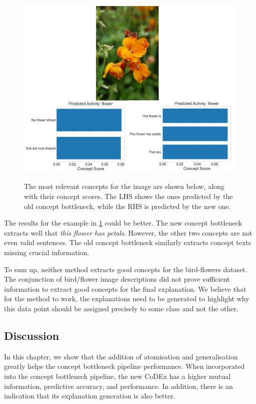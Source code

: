\begin{figure}[h]
\caption{The most relevant concepts for the image are shown below, along with their concept scores. The LHS shows the ones predicted by the old concept bottleneck, while the RHS is predicted by the new one.}
\centering
\includegraphics[width=\textwidth]{concept-bottleneck-pipeline/flower_predictions.png}
\label{flower-concept-predictions}
\end{figure}

The results for the example in \ref{flower-concept-predictions} could be better.
The new concept bottleneck extracts well that \emph{this flower has petals}.
However, the other two concepts are not even valid sentences.
The old concept bottleneck similarly extracts concept texts missing crucial information.


To sum up, neither method extracts good concepts for the bird-flowers dataset.
The conjunction of bird/flower image descriptions did not prove sufficient information to extract good concepts for the final explanation.
We believe that for the method to work, the explanations need to be generated to highlight why this data point should be assigned precisely to some class and not the other.


\subsection{Discussion}

In this chapter, we show that the addition of atomisation and generalisation greatly helps the concept bottleneck pipeline performance.
When incorporated into the concept bottleneck pipeline, the new CoDEx has a higher mutual information,  predictive accuracy, and performance.
In addition, there is an indication that its explanation generation is also better.

